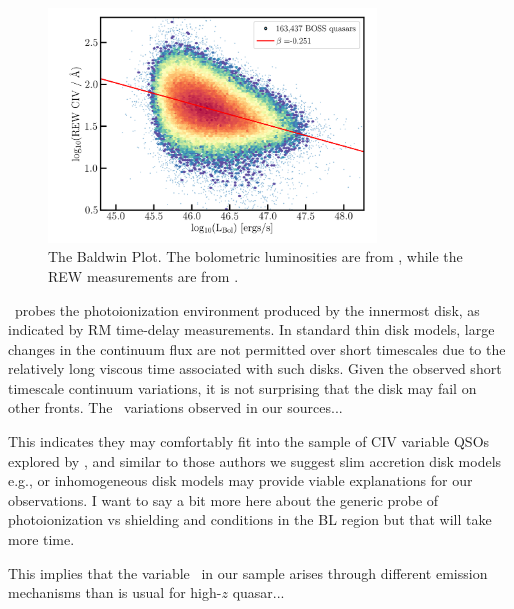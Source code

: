 \documentclass[a4paper,fleqn,usenatbib]{mnras}
\begin{document}
\begin{figure}
  \centering
  \includegraphics[width=8.7cm, trim=0.2cm 0.2cm 0.2cm 0.2cm, clip]
  {figures/CIV_CLQs_Baldwin_LBol_20191015.png}
   \vspace{-12pt}
   \caption[]{The Baldwin Plot. The bolometric luminosities are from \citet{Kozlowski2017},
     while the REW measurements are from \citet{Hamann2017}.}
  \label{fig:REWvsFWHM}
\end{figure}

\civ\ probes the photoionization environment produced by the innermost
disk, as indicated by RM time-delay measurements. In standard \citet{SS73}
thin disk models, large changes in the continuum flux are not
permitted over short timescales due to the relatively long viscous
time associated with such disks. Given the observed short timescale
continuum variations, it is not surprising that the \citet{SS73} disk may fail
on other fronts. The \civ\ variations observed in our sources... 

This indicates they may comfortably fit into the sample of CIV
variable QSOs explored by \citet{Dyer2019}, and similar to those
authors we suggest slim accretion disk models e.g., 
\citet[][]{Abramowicz1988} or inhomogeneous disk models
\citep[e.g.,][]{DexterAgol2011} may provide viable explanations for
our observations. I want to say a bit more here about the generic
probe of photoionization vs shielding and conditions in the BL region
but that will take more time.

This implies that the variable \civ\ in our sample arises through
different emission mechanisms than is usual for high-$z$ quasar...
\end{document}
